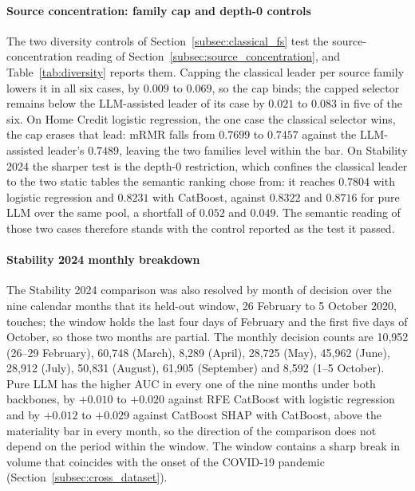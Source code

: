 \documentclass[final,5p,twocolumn]{elsarticle}
\begin{document}
\paragraph{Source concentration: family cap and depth-0 controls}
The two diversity controls of Section~\ref{subsec:classical_fs} test the source-concentration reading of Section~\ref{subsec:source_concentration}, and Table~\ref{tab:diversity} reports them. Capping the classical leader per source family lowers it in all six cases, by $0.009$ to $0.069$, so the cap binds; the capped selector remains below the LLM-assisted leader of its case by $0.021$ to $0.083$ in five of the six. On Home Credit logistic regression, the one case the classical selector wins, the cap erases that lead: mRMR falls from $0.7699$ to $0.7457$ against the LLM-assisted leader's $0.7489$, leaving the two families level within the bar. On Stability 2024 the sharper test is the depth-0 restriction, which confines the classical leader to the two static tables the semantic ranking chose from: it reaches $0.7804$ with logistic regression and $0.8231$ with CatBoost, against $0.8322$ and $0.8716$ for pure LLM over the same pool, a shortfall of $0.052$ and $0.049$. The semantic reading of those two cases therefore stands with the control reported as the test it passed.

\paragraph{Stability 2024 monthly breakdown}
The Stability 2024 comparison was also resolved by month of decision over the nine calendar months that its held-out window, 26 February to 5 October 2020, touches; the window holds the last four days of February and the first five days of October, so those two months are partial. The monthly decision counts are 10,952 (26--29 February), 60,748 (March), 8,289 (April), 28,725 (May), 45,962 (June), 28,912 (July), 50,831 (August), 61,905 (September) and 8,592 (1--5 October). Pure LLM has the higher AUC in every one of the nine months under both backbones, by $+0.010$ to $+0.020$ against RFE CatBoost with logistic regression and by $+0.012$ to $+0.029$ against CatBoost SHAP with CatBoost, above the materiality bar in every month, so the direction of the comparison does not depend on the period within the window. The window contains a sharp break in volume that coincides with the onset of the COVID-19 pandemic (Section~\ref{subsec:cross_dataset}).
\end{document}

